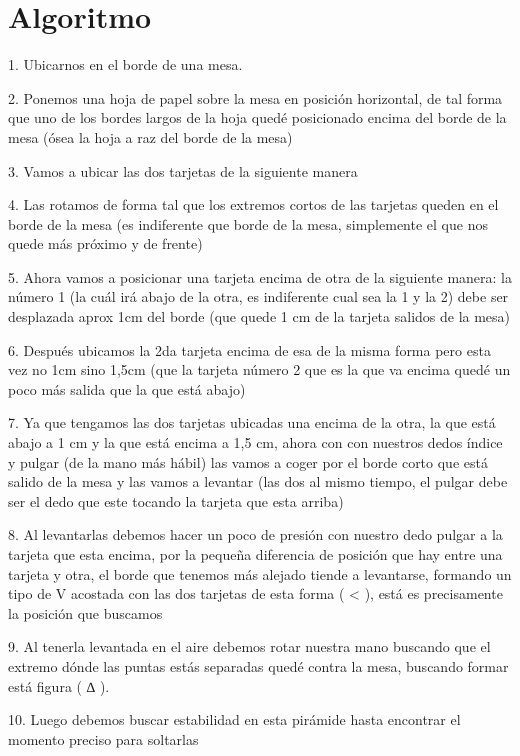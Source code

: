 \documentclass{article}
\begin{document}
\section{Algoritmo} \label{contenido} 
1. Ubicarnos en el borde de una mesa.\par
2. Ponemos una hoja de papel sobre la mesa en posición horizontal, de tal forma que uno de los bordes largos de la hoja quedé posicionado encima del borde de la mesa (ósea la hoja a raz del borde de la mesa)\par
3. Vamos a ubicar las dos tarjetas de la siguiente manera\par
4. Las rotamos de forma tal que los extremos cortos de las tarjetas queden en el borde de la mesa (es indiferente que borde de la mesa, simplemente el que nos quede más próximo y de frente)\par
5. Ahora vamos a posicionar una tarjeta encima de otra de la siguiente manera: la número 1 (la cuál irá abajo de la otra, es indiferente cual sea la 1 y la 2) debe ser desplazada aprox 1cm del borde (que quede 1 cm de la tarjeta salidos de la mesa)\par
6. Después ubicamos la 2da tarjeta encima de esa de la misma forma pero esta vez no 1cm sino 1,5cm (que la tarjeta número 2 que es la que va encima quedé un poco más salida que la que está abajo)\par
7. Ya que tengamos las dos tarjetas ubicadas una encima de la otra, la que está abajo a 1 cm y la que está encima a 1,5 cm, ahora con con nuestros dedos índice y pulgar (de la mano más hábil) las vamos a coger por el borde corto que está salido de la mesa y las vamos a levantar (las dos al mismo tiempo, el pulgar debe ser el dedo que este tocando la tarjeta que esta arriba)\par
8. Al levantarlas debemos hacer un poco de presión con nuestro dedo pulgar a la tarjeta que esta encima, por la pequeña diferencia de posición que hay entre una tarjeta y otra, el borde que tenemos más alejado tiende a levantarse, formando un tipo de V acostada con las dos tarjetas de esta forma ( < ), está es precisamente la posición que buscamos\par
9. Al tenerla levantada en el aire debemos rotar nuestra mano buscando que el extremo dónde las puntas estás separadas quedé contra la mesa, buscando formar está figura ( ∆ ).\par
10. Luego debemos buscar estabilidad en esta pirámide hasta encontrar el momento preciso para soltarlas\par
\end{document}
